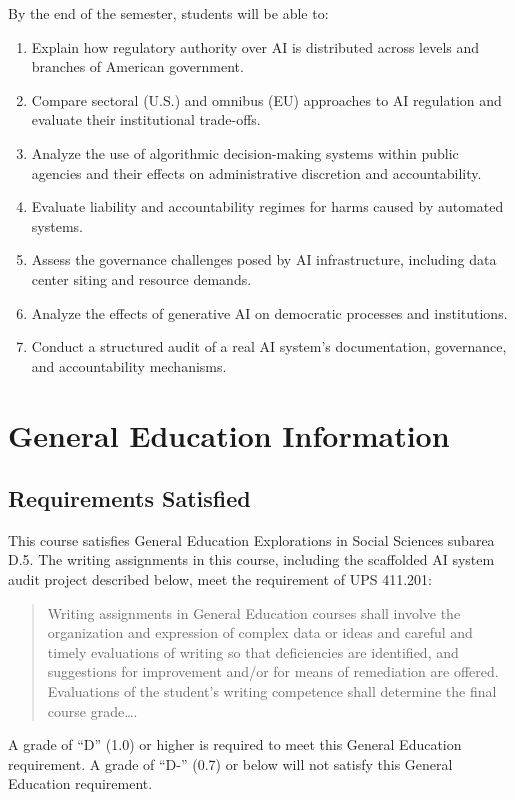 \documentclass[12pt]{article}
\begin{document}
{\setlength{\parindent}{0pt}\setlength{\parskip}{0.6\baselineskip}%
By the end of the semester, students will be able to:

\begin{enumerate}
    \item Explain how regulatory authority over AI is distributed across levels and branches of American government.
    \item Compare sectoral (U.S.) and omnibus (EU) approaches to AI regulation and evaluate their institutional trade-offs.
    \item Analyze the use of algorithmic decision-making systems within public agencies and their effects on administrative discretion and accountability.
    \item Evaluate liability and accountability regimes for harms caused by automated systems.
    \item Assess the governance challenges posed by AI infrastructure, including data center siting and resource demands.
    \item Analyze the effects of generative AI on democratic processes and institutions.
    \item Conduct a structured audit of a real AI system's documentation, governance, and accountability mechanisms.
\end{enumerate}
}

\section*{General Education Information}
\subsection*{Requirements Satisfied}
This course satisfies General Education Explorations in Social Sciences subarea D.5. The writing assignments in this course, including the scaffolded AI system audit project described below, meet the requirement of UPS 411.201:
\begin{quote}Writing assignments in General Education courses shall involve the organization and expression of complex data or ideas and careful and timely evaluations of writing so that deficiencies are identified, and suggestions for improvement and/or for means of remediation are offered. Evaluations of the student's writing competence shall determine the final course grade\ldots .\end{quote}
A grade of ``D'' (1.0) or higher is required to meet this General Education requirement. A grade of ``D-'' (0.7) or below will not satisfy this General Education requirement.
\end{document}
